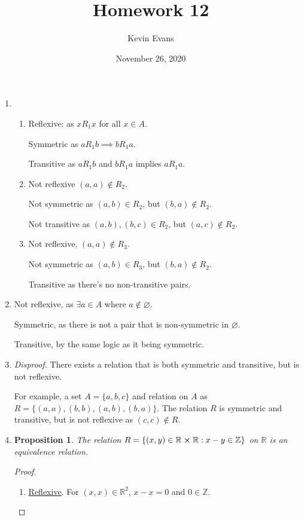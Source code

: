 \documentclass{homework}
\title{Homework 12}
\author{Kevin Evans}
\date{November 26, 2020}
\newtheorem*{prop}{Proposition}
\begin{document}
	\maketitle
	\begin{enumerate}
		\item \begin{enumerate}
			\item Reflexive: as $x R_1 x$ for all $x \in A$.
			
				Symmetric as $a R_1 b \implies b R_1 a$.
				
				Transitive as $a R_1 b$  and $b R_1 a$ implies $a R_1 a$.
				
			\item Not reflexive $(a, a) \notin R_2$.
			
				Not symmetric as $(a, b) \in R_2$, but $(b, a) \notin R_2$.
				
				Not transitive as $(a, b), (b, c) \in R_2$, but $(a, c) \notin R_2$.
				
			\item Not reflexive, $(a, a) \notin R_3$.
			
				Not symmetric as $(a, b) \in R_3$, but $(b, a) \notin R_2$.
				
				Transitive as there's no non-transitive pairs.
		\end{enumerate}
	
		\item Not reflexive, as $\exists a \in A$ where $a \notin \varnothing$.
		
		Symmetric, as there is not a pair that is non-symmetric in $\varnothing$.
		
		Transitive, by the same logic as it being symmetric.
		
		\item \textit{Disproof.} There exists a relation that is both symmetric and transitive, but is not reflexive. 
		
		For example, a set $A = \{a, b, c\}$ and relation on $A$ as $R = \{(a, a), (b, b), (a, b), (b, a)\}$. The relation $R$ is symmetric and transitive, but is not reflexive as $(c, c) \notin R$.
		
		\item \begin{minipage}[t]{\linewidth}
			\begin{prop}
				The relation $R = \{ (x, y) \in \mathbb{R} \cross \mathbb{R} : x - y \in \mathbb{Z}\}$ on $\mathbb{R}$ is an equivalence relation. 
			\end{prop}
			\begin{proof} \begin{enumerate}
					\item \underline{Reflexive}. For $(x, x) \in \mathbb{R}^2$, $x-x = 0$ and $0 \in \mathbb{Z}$.
					

\end{enumerate}
\end{proof}
\end{minipage}
\end{enumerate}
\end{document}
